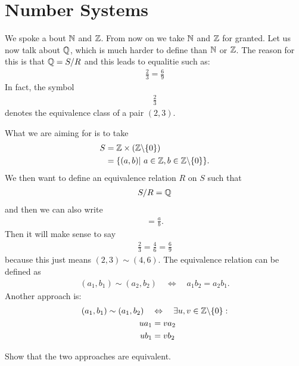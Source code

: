 \section{Number Systems}

We spoke a bout $\mathbb N$ and $\mathbb Z$. From now on we take $\mathbb N$ and $\mathbb Z$ for granted. 
Let us now talk about $\mathbb Q$, which is much harder to define than $\mathbb N$ or $\mathbb Z$. The reason for this is that $\mathbb Q = S/R$ and this leads to equalitie such as:
\begin{align*}
\frac 2 3 = \frac 6 9
\end{align*}
In fact, the symbol
\begin{align*}
\frac 2 3
\end{align*}
denotes the equivalence class of a pair $(2,3)$. 

What we are aiming for is to take
\begin{align*}
S & = \mathbb Z \times (\mathbb Z \backslash \{0 \}) \\
& = \{(a,b)|~ a \in \mathbb Z, b \in \mathbb Z \backslash \{0\} \}.
\end{align*}
We then want to define an equivalence relation $R$ on $S$ such that
\begin{align*}
S/R = \mathbb Q
\end{align*}
and then we can also write
\begin{align*}
[(a,b)] = \frac a b.
\end{align*}
Then it will make sense to say
\begin{align*}
\frac 2 3 = \frac 4 6 = \frac 6 9
\end{align*}
because this just means $(2,3) \sim (4,6)$.
The equivalence relation can be defined as 
\begin{align*}
(a_1, b_1) \sim (a_2, b_2) \quad \Leftrightarrow \quad a_1 b_2 = a_2 b_1.
\end{align*}
Another approach is:
\begin{align*}
(a_1, b_1) \sim (a_1, b_2) \quad & \Leftrightarrow \quad \exists u,v \in \mathbb Z \backslash \{0\}: \\
ua_1 & = va_2 \\
ub_1 & = vb_2
\end{align*}


\begin{ec}
	Show that the two approaches are equivalent.
\end{ec}

